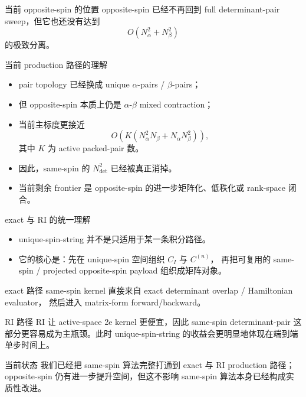 \documentclass[aspectratio=169,professionalfonts]{ctexbeamer}
\newcommand{\Na}{N_{\alpha}}
\newcommand{\Nb}{N_{\beta}}
\newcommand{\Cmat}{C}
\begin{document}
\begin{frame}{当前 opposite-spin 的位置}
  \small
  opposite-spin 已经不再回到 full determinant-pair sweep，但它也还没有达到
  \[
  O(\Na^2 + \Nb^2)
  \]
  的极致分离。

  \begin{block}{当前 production 路径的理解}
    \begin{itemize}
      \item pair topology 已经换成 unique \(\alpha\)-pairs / \(\beta\)-pairs；
      \item 但 opposite-spin 本质上仍是 \(\alpha\)-\(\beta\) mixed contraction；
      \item 当前主标度更接近
      \[
      O\!\left(K(\Na^2\Nb + \Na\Nb^2)\right),
      \]
      其中 \(K\) 为 active packed-pair 数。
    \end{itemize}
  \end{block}

  \begin{itemize}
    \item 因此，same-spin 的 \(N_{\det}^2\) 已经被真正消掉。
    \item 当前剩余 frontier 是 opposite-spin 的进一步矩阵化、低秩化或 rank-space 闭合。
  \end{itemize}
\end{frame}

\begin{frame}{exact 与 RI 的统一理解}
  \small
  \begin{itemize}
    \item unique-spin-string 并不是只适用于某一条积分路径。
    \item 它的核心是：先在 unique-spin 空间组织 \(\Cmat_I\) 与 \(\Cmat^{(n)}\)，
      再把可复用的 same-spin / projected opposite-spin payload 组织成矩阵对象。
  \end{itemize}

  \begin{block}{exact 路径}
    same-spin kernel 直接来自 exact determinant overlap / Hamiltonian evaluator，
    然后进入 matrix-form forward/backward。
  \end{block}

  \begin{block}{RI 路径}
    RI 让 active-space 2e kernel 更便宜，因此 same-spin determinant-pair
    这部分更容易成为主瓶颈。此时 unique-spin-string 的收益会更明显地体现在端到端单步时间上。
  \end{block}

  \begin{alertblock}{当前状态}
    我们已经把 same-spin 算法完整打通到 exact 与 RI production 路径；
    opposite-spin 仍有进一步提升空间，但这不影响 same-spin 算法本身已经构成实质性改进。
  \end{alertblock}
\end{frame}
\end{document}
